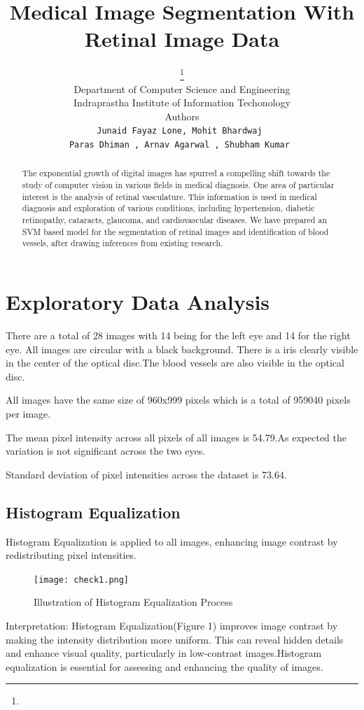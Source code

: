 \documentclass{article}
\title{Medical Image Segmentation With Retinal Image Data }
\author{%
  \thanks{} \\
  Department of Computer Science and Engineering\\
  Indraprastha Institute of Information Techonology\\
  Authors\\
  \texttt{Junaid Fayaz Lone, Mohit Bhardwaj }\\
  \texttt{Paras Dhiman , Arnav Agarwal , Shubham Kumar } 
  }
\begin{document}
\maketitle

\begin{abstract}


The exponential growth of digital images has spurred a compelling shift towards the study of computer vision in various fields in medical diagnosis. One area of particular interest is the analysis of retinal vasculature. This information is used in medical diagnosis and exploration of various conditions, including hypertension, diabetic retinopathy, cataracts, glaucoma, and cardiovascular diseases. We have prepared an SVM based model for the segmentation of retinal images and identification of blood vessels, after drawing inferences from existing research. 


\end{abstract}

\section{Exploratory Data Analysis}
There are a total of 28 images with 14 being for the left eye and 14 for the right eye. All images are circular with a black background. There is a iris clearly visible in the center of the optical disc.The blood vessels are also visible in the optical disc.

All images have the same size of 960x999 pixels which is a total of 959040 pixels per image.

The mean pixel intensity across all pixels of all images is 54.79.As expected the variation is not significant across the two eyes.

Standard deviation of pixel intensities across the dataset is 73.64.

\subsection{Histogram Equalization}

Histogram Equalization is applied to all images, enhancing image contrast by redistributing pixel intensities.
\begin{figure}[h]
  \centering
  \texttt{[image: check1.png]}
  \caption{Illustration of Histogram Equalization Process}
  \label{fig:example}
\end{figure}
Interpretation:
Histogram Equalization(Figure 1) improves image contrast by making the intensity distribution more uniform. This can reveal hidden details and enhance visual quality, particularly in low-contrast images.Histogram equalization is essential for assessing and enhancing the quality of images. 
\end{document}
